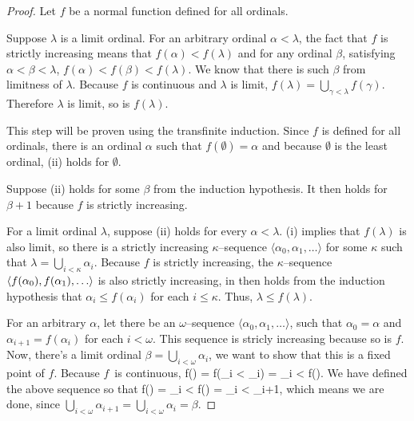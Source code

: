 \begin{proof}
Let $f$ be a normal function defined for all ordinals.
\bce[(i)]
\item
Suppose $\lambda$ is a limit ordinal. 
For an arbitrary ordinal $\alpha < \lambda$, the fact that $f$ is strictly increasing means that $f(\alpha) < f(\lambda)$ and for any ordinal $\beta$, 
satisfying $\alpha < \beta < \lambda$, $f(\alpha) < f(\beta) < f(\lambda)$. 
We know that there is such $\beta$ from limitness of $\lambda$.
Because $f$ is continuous and $\lambda$ is limit, $f(\lambda) = \bigcup_{\gamma < \lambda} f(\gamma)$.%
Therefore $\lambda$ is limit, so is $f(\lambda)$.

\item This step will be proven using the transfinite induction.
Since $f$ is defined for all ordinals, there is an ordinal $\alpha$ such that $f(\emptyset) = \alpha$ and because $\emptyset$ is the least ordinal, (ii) holds for $\emptyset$.

Suppose (ii) holds for some $\beta$ from the induction hypothesis. It then holds for $\beta+1$ because $f$ is strictly increasing. 

For a limit ordinal $\lambda$, suppose (ii) holds for every $\alpha < \lambda$. (i) implies that $f(\lambda)$ is also limit, 
so there is a strictly increasing $\kappa$–sequence $\langle \alpha_0, \alpha_1, \ldots \rangle$ for some $\kappa$ such that $\lambda = \bigcup_{i<\kappa} \alpha_i$. Because $f$ is strictly increasing, the $\kappa$–sequence $\langle f(\alpha_0), f(\alpha_1), \ldots \rangle$ is also strictly increasing, in then holds from the induction hypothesis that $\alpha_i \leq f(\alpha_i)$ for each $i \leq \kappa$. 
Thus, $\lambda \leq f(\lambda)$.

\item For an arbitrary $\alpha$, let there be an $\omega$–sequence $\langle \alpha_0, \alpha_1, \ldots \rangle$, 
such that $\alpha_0 = \alpha$ and $\alpha_{i+1} = f(\alpha_i)$ for each $i < \omega$.
This sequence is stricly increasing because so is $f$. 
Now, there's a limit ordinal $\beta = \bigcup_{i < \omega} \alpha_i$, we want to show that this is a fixed point of $f$. 
Because $f$~is continuous,
\beq
f(\beta) = f(\bigcup_{i < \omega} \alpha_i) = \bigcup_{i < \omega} f(\alpha)\mbox{.}
\eeq 
We have defined the above sequence so that 
\beq
f(\beta) = \bigcup_{i < \omega} f(\alpha) = \bigcup_{i < \omega} \alpha_{i+1}\mbox{,}
\eeq 
which means we are done, since $\bigcup_{i < \omega} \alpha_{i+1} = \bigcup_{i < \omega} \alpha_{i}  = \beta$.


\end{proof}
